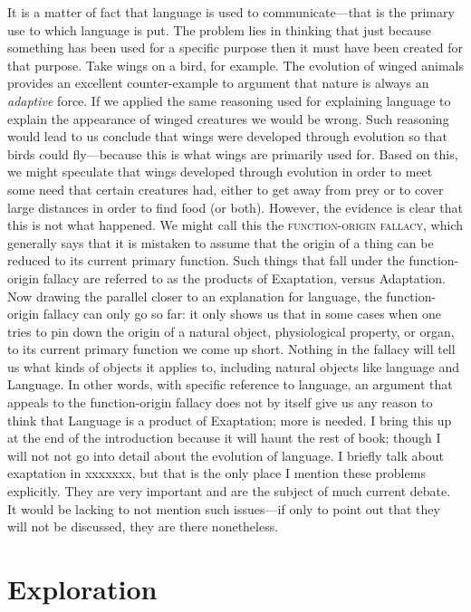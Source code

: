 \documentclass[11pt]{book}%
\theoremstyle{plain}
\numberwithin{equation}{section}
\theoremstyle{definition}
\newtheorem{phrase string}{Phrase String}
\begin{document}
It is a matter of fact that language is used to communicate---that is the primary use to which language is put. The problem lies in thinking that just because something has been used for a specific purpose then it must have been created for that purpose. Take wings on a bird, for example. The evolution of winged animals provides an excellent counter-example to argument that nature is always an \textsl{adaptive} force. If we applied the same reasoning used for explaining language to explain the appearance of winged creatures we would be wrong. Such reasoning would lead to us conclude that wings were developed through evolution so that birds could fly---because this is what wings are primarily used for. Based on this, we might speculate that wings developed through evolution in order to meet some need that certain creatures had, either to get away from prey or to cover large distances in order to find food (or both). However, the evidence is clear that this is not what happened. We might call this the \textsc{function-origin fallacy}, which generally says that it is mistaken to assume that the origin of a thing can be reduced to its current primary function. Such things that fall under the function-origin fallacy are referred to as the products of Exaptation, versus Adaptation. Now drawing the parallel closer to an explanation for language, the function-origin fallacy can only go so far: it only shows us that in some cases when one tries to pin down the origin of a natural object, physiological property, or organ, to its current primary function we come up short. Nothing in the fallacy will tell us what kinds of objects it applies to, including natural objects like language and Language. In other words, with specific reference to language, an argument that appeals to the function-origin fallacy does not by itself give us any reason to think that Language is a product of Exaptation; more is needed. I bring this up at the end of the introduction because it will haunt the rest of book; though I will not not go into detail about the evolution of language. I briefly talk about exaptation in xxxxxxx, but that is the only place I mention these problems explicitly. They are very important and are the subject of much current debate. It would be lacking to not mention such issues---if only to point out that they will not be discussed, they are there nonetheless.   



\part{Exploration}%
\end{document}
